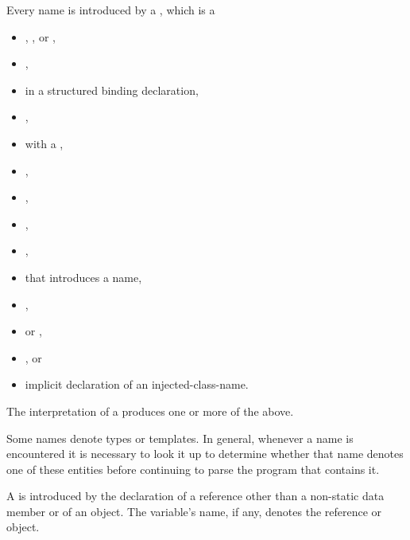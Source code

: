 \pnum
Every name is introduced by a , which is a
\begin{itemize}
\item
{},
, or
,
\item
{},
\item
{}
in a structured binding declaration,
\item
{},
\item
{} with a ,
\item
{},
\item
{},
\item
{},
\item
{},
\item
{}
that introduces a name,
\item
{},
\item
{} or
,
\item
{}, or
\item
implicit declaration of an injected-class-name.
\end{itemize}
\begin{note}
The interpretation of a  produces
one or more of the above.
\end{note}

\pnum
\begin{note}
Some names denote types or templates.
In general, whenever a name is encountered
it is necessary to look it up
to determine whether that name denotes one of these entities
before continuing to parse the program that contains it.
\end{note}

\pnum
A  is introduced by the
declaration of
a reference other than a non-static data member or of
an object. The variable's name, if any, denotes the reference or object.

